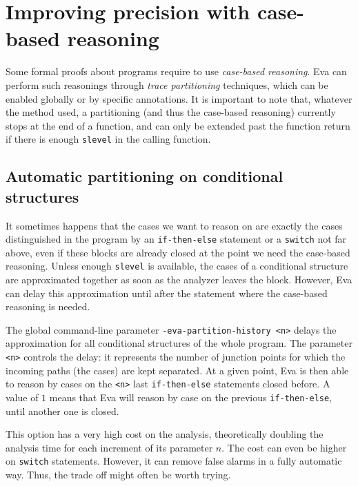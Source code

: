 \documentclass[web]{frama-c-book}
\newcommand{\Eva}{\textsf{Eva}}
\begin{document}
\section{Improving precision with case-based reasoning}
\label{trace-partitioning}

Some formal proofs about programs require to use \emph{case-based reasoning}.
\Eva{} can perform such reasonings through \emph{trace partitioning}
\cite{trace-partitioning} techniques, which can be enabled globally or
by specific annotations. It is important to note that, whatever the method used,
a partitioning (and thus the case-based reasoning) currently stops at the end of
a function, and can only be extended past the function return if there is enough
\lstinline|slevel| in the calling function.


\subsection{Automatic partitioning on conditional structures}

It sometimes happens that the cases we want to reason on are exactly the
cases distinguished in the program by an \lstinline|if-then-else| statement or a
\lstinline|switch| not far above, even if these blocks are already closed
at the point we need the case-based reasoning. Unless enough
\lstinline|slevel| is available, the cases of a conditional structure are
approximated together as soon as the analyzer leaves the block. However, \Eva{}
can delay this approximation until after the statement where the case-based
reasoning is needed.

The global command-line parameter \lstinline|-eva-partition-history <n>|
delays the approximation for all conditional structures of the whole
program. The parameter \lstinline|<n>| controls the delay:
it represents the number of junction points for which the incoming
paths (the cases) are kept separated. At a given point, \Eva{} is then able to
reason by cases on the \lstinline|<n>| last \lstinline|if-then-else| statements
closed before.
A value of $1$ means that \Eva{} will reason by
case on the previous \lstinline|if-then-else|, until another one is closed.

This option has a very high cost on the analysis, theoretically doubling the
analysis time for each increment of its parameter $n$.
The cost can even be higher on \lstinline|switch| statements.
However, it can remove false alarms in a fully automatic way. Thus,
the trade off might often be worth trying.
\end{document}
